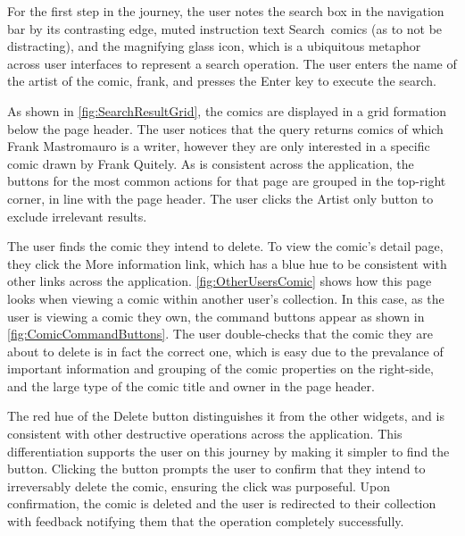 \documentclass[fontsize=12pt,a4paper]{scrreprt}
\begin{document}
For the first step in the journey, the user notes the search box in the navigation bar by its contrasting edge, muted instruction text \textsf{Search~comics} (as to not be distracting), and the magnifying glass icon, which is a ubiquitous metaphor across user interfaces to represent a search operation. The user enters the name of the artist of the comic, \textsf{frank}, and presses the \textsf{Enter} key to execute the search.

As shown in \autoref{fig:SearchResultGrid}, the comics are displayed in a grid formation below the page header. The user notices that the query returns comics of which \textsf{Frank Mastromauro} is a writer, however they are only interested in a specific comic drawn by \textsf{Frank Quitely}. As is consistent across the application, the buttons for the most common actions for that page are grouped in the top-right corner, in line with the page header. The user clicks the \textsf{Artist only} button to exclude irrelevant results.

The user finds the comic they intend to delete. To view the comic's detail page, they click the \textsf{More information} link, which has a blue hue to be consistent with other links across the application. \autoref{fig:OtherUsersComic} shows how this page looks when viewing a comic within another user's collection. In this case, as the user is viewing a comic they own, the command buttons appear as shown in \autoref{fig:ComicCommandButtons}. The user double-checks that the comic they are about to delete is in fact the correct one, which is easy due to the prevalance of important information and grouping of the comic properties on the right-side, and the large type of the comic title and owner in the page header.

The red hue of the \textsf{Delete} button distinguishes it from the other widgets, and is consistent with other destructive operations across the application. This differentiation supports the user on this journey by making it simpler to find the button. Clicking the button prompts the user to confirm that they intend to irreversably delete the comic, ensuring the click was purposeful. Upon confirmation, the comic is deleted and the user is redirected to their collection with feedback notifying them that the operation completely successfully.
\end{document}
